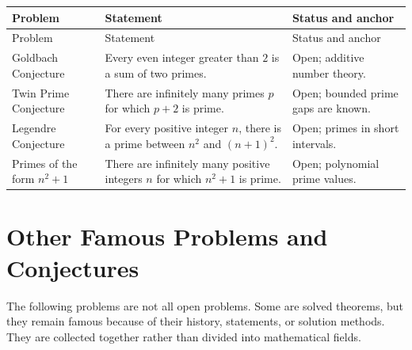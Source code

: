     {\small
    \renewcommand{\arraystretch}{1.18}
    \begin{longtable}{@{}L{0.25\textwidth}L{0.47\textwidth}L{0.20\textwidth}@{}}
        \toprule
        Problem & Statement & Status and anchor \\
        \midrule
        \endfirsthead

        \toprule
        Problem & Statement & Status and anchor \\
        \midrule
        \endhead

        \bottomrule
        \endlastfoot

        Goldbach Conjecture
        & Every even integer greater than $2$ is a sum of two primes.
        & Open; additive number theory. \\

        Twin Prime Conjecture
        & There are infinitely many primes $p$ for which $p+2$ is prime.
        & Open; bounded prime gaps are known. \\

        Legendre Conjecture
        & For every positive integer $n$, there is a prime between $n^2$ and
          $(n+1)^2$.
        & Open; primes in short intervals. \\

        Primes of the form $n^2+1$
        & There are infinitely many positive integers $n$ for which $n^2+1$ is
          prime.
        & Open; polynomial prime values. \\
    \end{longtable}
    }

    \section*{Other Famous Problems and Conjectures}

    The following problems are not all open problems. Some are solved theorems,
    but they remain famous because of their history, statements, or solution
    methods. They are collected together rather than divided into mathematical
    fields.

    \vspace{1em}

